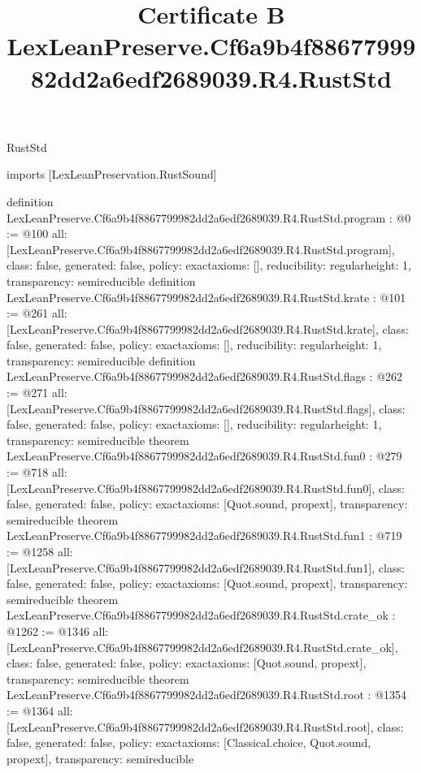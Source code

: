\begin{lexlean}{RustStd}
\title{Certificate B LexLeanPreserve.Cf6a9b4f8867799982dd2a6edf2689039.R4.RustStd}
\begin{coremodule}
imports [LexLeanPreservation.RustSound]

definition LexLeanPreserve.Cf6a9b4f8867799982dd2a6edf2689039.R4.RustStd.program : @0 := @100 {
  all: [LexLeanPreserve.Cf6a9b4f8867799982dd2a6edf2689039.R4.RustStd.program],
  class: false,
  generated: false,
  policy: exact{axioms: []},
  reducibility: regular{height: 1},
  transparency: semireducible
}
definition LexLeanPreserve.Cf6a9b4f8867799982dd2a6edf2689039.R4.RustStd.krate : @101 := @261 {
  all: [LexLeanPreserve.Cf6a9b4f8867799982dd2a6edf2689039.R4.RustStd.krate],
  class: false,
  generated: false,
  policy: exact{axioms: []},
  reducibility: regular{height: 1},
  transparency: semireducible
}
definition LexLeanPreserve.Cf6a9b4f8867799982dd2a6edf2689039.R4.RustStd.flags : @262 := @271 {
  all: [LexLeanPreserve.Cf6a9b4f8867799982dd2a6edf2689039.R4.RustStd.flags],
  class: false,
  generated: false,
  policy: exact{axioms: []},
  reducibility: regular{height: 1},
  transparency: semireducible
}
theorem LexLeanPreserve.Cf6a9b4f8867799982dd2a6edf2689039.R4.RustStd.fun0 : @279 := @718 {
  all: [LexLeanPreserve.Cf6a9b4f8867799982dd2a6edf2689039.R4.RustStd.fun0],
  class: false,
  generated: false,
  policy: exact{axioms: [Quot.sound, propext]},
  transparency: semireducible
}
theorem LexLeanPreserve.Cf6a9b4f8867799982dd2a6edf2689039.R4.RustStd.fun1 : @719 := @1258 {
  all: [LexLeanPreserve.Cf6a9b4f8867799982dd2a6edf2689039.R4.RustStd.fun1],
  class: false,
  generated: false,
  policy: exact{axioms: [Quot.sound, propext]},
  transparency: semireducible
}
theorem LexLeanPreserve.Cf6a9b4f8867799982dd2a6edf2689039.R4.RustStd.crate_ok : @1262 := @1346 {
  all: [LexLeanPreserve.Cf6a9b4f8867799982dd2a6edf2689039.R4.RustStd.crate_ok],
  class: false,
  generated: false,
  policy: exact{axioms: [Quot.sound, propext]},
  transparency: semireducible
}
theorem LexLeanPreserve.Cf6a9b4f8867799982dd2a6edf2689039.R4.RustStd.root : @1354 := @1364 {
  all: [LexLeanPreserve.Cf6a9b4f8867799982dd2a6edf2689039.R4.RustStd.root],
  class: false,
  generated: false,
  policy: exact{axioms: [Classical.choice, Quot.sound, propext]},
  transparency: semireducible
}


\end{coremodule}
\end{lexlean}
